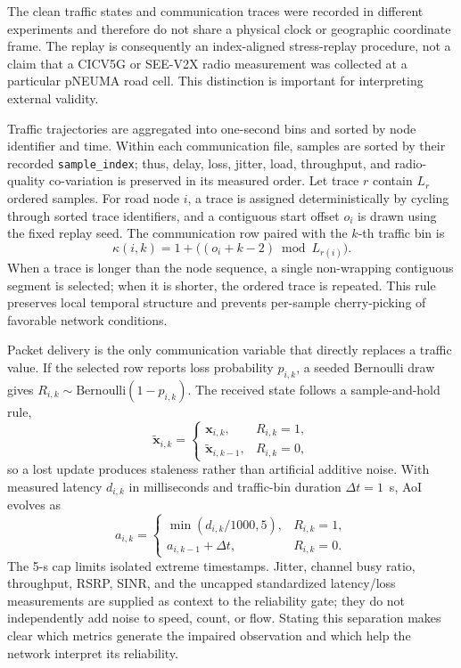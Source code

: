 \documentclass[pdflatex,sn-mathphys-num]{sn-jnl}%
\newenvironment{changed}{\color{blue}}{}
\theoremstyle{thmstyleone}%
\theoremstyle{thmstyletwo}%
\theoremstyle{thmstylethree}%
\begin{document}
\begin{changed}
The clean traffic states and communication traces were recorded in different experiments and therefore do not share a physical clock or geographic coordinate frame. The replay is consequently an index-aligned stress-replay procedure, not a claim that a CICV5G or SEE-V2X radio measurement was collected at a particular pNEUMA road cell. This distinction is important for interpreting external validity.

Traffic trajectories are aggregated into one-second bins and sorted by node identifier and time. Within each communication file, samples are sorted by their recorded \texttt{sample\_index}; thus, delay, loss, jitter, load, throughput, and radio-quality co-variation is preserved in its measured order. Let trace \(r\) contain \(L_r\) ordered samples. For road node \(i\), a trace is assigned deterministically by cycling through sorted trace identifiers, and a contiguous start offset \(o_i\) is drawn using the fixed replay seed. The communication row paired with the \(k\)-th traffic bin is
\begin{equation}
    \kappa(i,k)=1+\bigl((o_i+k-2)\bmod L_{r(i)}\bigr).
\end{equation}
When a trace is longer than the node sequence, a single non-wrapping contiguous segment is selected; when it is shorter, the ordered trace is repeated. This rule preserves local temporal structure and prevents per-sample cherry-picking of favorable network conditions.

Packet delivery is the only communication variable that directly replaces a traffic value. If the selected row reports loss probability \(p_{i,k}\), a seeded Bernoulli draw gives \(R_{i,k}\sim\mathrm{Bernoulli}(1-p_{i,k})\). The received state follows a sample-and-hold rule,
\begin{equation}
\widetilde{\mathbf{x}}_{i,k}=
\begin{cases}
\mathbf{x}_{i,k}, & R_{i,k}=1,\\
\widetilde{\mathbf{x}}_{i,k-1}, & R_{i,k}=0,
\end{cases}
\end{equation}
so a lost update produces staleness rather than artificial additive noise. With measured latency \(d_{i,k}\) in milliseconds and traffic-bin duration \(\Delta t=1\)~s, AoI evolves as
\begin{equation}
a_{i,k}=
\begin{cases}
\min(d_{i,k}/1000,5), & R_{i,k}=1,\\
a_{i,k-1}+\Delta t, & R_{i,k}=0.
\end{cases}
\end{equation}
The 5-s cap limits isolated extreme timestamps. Jitter, channel busy ratio, throughput, RSRP, SINR, and the uncapped standardized latency/loss measurements are supplied as context to the reliability gate; they do not independently add noise to speed, count, or flow. Stating this separation makes clear which metrics generate the impaired observation and which help the network interpret its reliability.


\end{changed}
\end{document}
